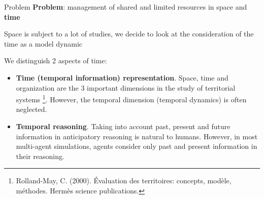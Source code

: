 \begin{frame}{Problem}
\textbf{Problem}: management of shared and limited resources in space and \textbf{time}
\par Space is subject to a lot of studies, we decide to look at the consideration of the time as a model dynamic
\par We distinguish 2 aspects of time:
\begin{itemize}
    \item \textbf{Time (temporal information) representation}. Space, time and organization are the 3 important dimensions in the study of territorial systems \footnote{Rolland-May, C. (2000). Évaluation des territoires: concepts, modèle, méthodes. Hermès science publications.}. However, \alert{the temporal dimension (temporal dynamics) is often neglected}.
    \vspace{.5cm}
    \item \textbf{Temporal reasoning}. Taking into account past, present and future information in anticipatory reasoning is natural to humans. However, \alert{in most multi-agent simulations, agents consider only past and present information in their reasoning}.
\end{itemize}


\end{frame}

